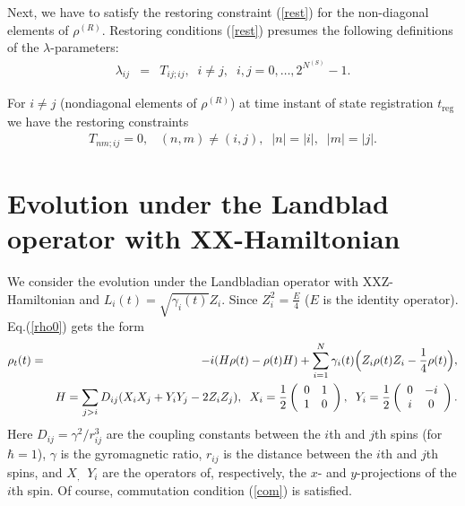 \documentclass[pra,preprint,showpacs]{revtex4-1}
\begin{document}
 Next, we have to satisfy the restoring constraint (\ref{rest}) for the non-diagonal elements of $\rho^{(R)}$.
Restoring conditions (\ref{rest})  presumes  the following definitions of  the $\lambda$-parameters:
\begin{eqnarray}\label{K}
\lambda_{ij} &=&T_{ij;ij},\;\; i\neq j,\;\; i,j=0,\dots,2^{N^{(S)}}-1.
\end{eqnarray}
\iffalse
In particular,
\begin{eqnarray}\label{K1}
\lambda_{0j} &=&T_{0j;0j}=\sum_{n_1 =0}^{2^{N-N^{(S)}}-1}W_{0 n_1,jn_1 ;0j}=W_{0j ;0j}   ,\;\;j=0,\dots,2^{N^{(S)}}-1.
\end{eqnarray}
For 1-excitation block we have
\begin{eqnarray}\label{K2}
\lambda_{ij} &=&T_{ij;ij}=\sum_{n_1 =0}^{2^{N-N^{(S)}}-1}W_{i n_1,jn_1 ;0j}=W_{i j ;ij}   ,\;\;i,j=0,\dots,2^{N^{(S)}}-1.
\end{eqnarray}
\fi
For $i\neq j $ (nondiagonal elements of $\rho^{(R)}$) at time instant of state registration $t_{\mathrm{reg}}$ we have the restoring constraints
\begin{eqnarray}\label{constr0}\label{P1}
T_{nm;ij}=0, \;\;\;(n,m)\neq (i,j), \;\;|n|=|i|,\;\;|m|=|j|.
\end{eqnarray}

\section{Evolution under the Landblad operator with XX-Hamiltonian}
\label{Section:ev}
We consider the evolution under the  Landbladian operator with XXZ-Hamiltonian and
$L_i(t) = \sqrt{\gamma_i(t)} Z_{i}$. Since $Z_{i}^2=\frac{E}{4}$ ($E$ is the identity operator). Eq.(\ref{rho0}) gets the form
 \begin{eqnarray}\label{rho}
 \rho_t(t)&=&-i (H  \rho(t) - \rho(t) H)+ \sum_{i=1}^N \gamma_i(t)\Big(Z_{i} \rho(t) Z_{i}
-\frac{1}{4} \rho(t) \Big),
\\\nonumber
&&H=\sum_{j>i} D_{ij} (X_{i}X_{j}+Y_{i}Y_{j}  -2 Z_i Z_j),\;\;
X_i=\frac{1}{2}\left(\begin{array}{cc}
0&1\cr
1&0
\end{array}\right),\;\;  Y_i=\frac{1}{2}\left(\begin{array}{cc}
0&-i\cr
i&0
\end{array}\right) .
\end{eqnarray}
{Here $D_{ij}=\gamma^2/r_{ij}^3$ are the coupling constants between the $i$th and $j$th spins (for $\hbar=1$), $\gamma$ is the gyromagnetic ratio,
$r_{ij}$  is the distance between the $i$th and $j$th spins}, and {$X_,\;\;Y_i$ are  the operators of, respectively, the $x$- and $y$-projections of the $i$th spin.} Of course, commutation condition (\ref{com}) is satisfied.
\end{document}

